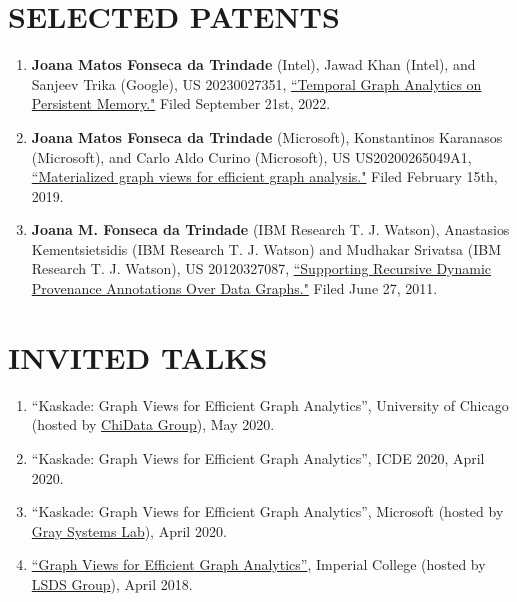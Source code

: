 \documentclass[centered,overlapped]{res}
\begin{document}
\begin{resume}
\section{SELECTED PATENTS}
\begin{enumerate}
  \item \textbf{Joana Matos Fonseca da Trindade} (Intel), Jawad Khan (Intel), and Sanjeev Trika (Google), US 20230027351, \href{https://patents.justia.com/patent/20230027351}{``Temporal Graph Analytics on Persistent Memory."} Filed September 21st, 2022.
  \item \textbf{Joana Matos Fonseca da Trindade} (Microsoft), Konstantinos Karanasos (Microsoft), and Carlo Aldo Curino (Microsoft), US US20200265049A1, \href{https://patents.google.com/patent/US20200265049A1/en}{``Materialized graph views for efficient graph analysis."} Filed February 15th, 2019.
  \item \textbf{Joana M. Fonseca da Trindade} (IBM Research T. J. Watson), Anastasios Kementsietsidis (IBM Research T. J. Watson) and Mudhakar Srivatsa (IBM Research T. J. Watson), US 20120327087, \href{http://www.faqs.org/patents/app/20120327087}{``Supporting Recursive Dynamic Provenance Annotations Over Data Graphs."} Filed June 27, 2011.
\end{enumerate}

\section{INVITED TALKS}
\begin{enumerate}
  \item ``Kaskade: Graph Views for Efficient Graph Analytics'', University of Chicago (hosted by \href{https://data.cs.uchicago.edu/}{ChiData Group}), May 2020.
  \item ``Kaskade: Graph Views for Efficient Graph Analytics'', ICDE 2020, April 2020.
  \item ``Kaskade: Graph Views for Efficient Graph Analytics'', Microsoft (hosted by \href{https://azuredata.microsoft.com}{Gray Systems Lab}), April 2020.
  \item \href{http://lsds.doc.ic.ac.uk/content/graph-views-efficient-graph-analytics-collaboration-microsoft-cisl}{``Graph Views for Efficient Graph Analytics''}, Imperial College (hosted by \href{https://lsds.doi.ic.ac.uk}{LSDS Group}), April 2018.
\end{enumerate}


\end{resume}
\end{document}
